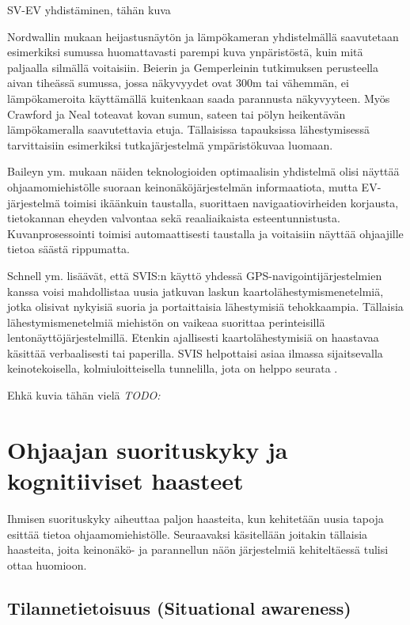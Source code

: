 \documentclass[utf8,bachelor,manualbib]{gradu3}
\begin{document}
SV-EV yhdistäminen, tähän kuva \citep{mollersachs1994}

Nordwallin \citeyearpar{nordwall1993} mukaan heijastusnäytön ja lämpökameran yhdistelmällä saavutetaan esimerkiksi sumussa huomattavasti parempi kuva ynpäristöstä, kuin mitä paljaalla silmällä voitaisiin. Beierin ja Gemperleinin \citeyearpar{beiergemperlein2004} tutkimuksen perusteella aivan tiheässä sumussa, jossa näkyvyydet ovat 300m tai vähemmän, ei lämpökameroita käyttämällä kuitenkaan saada parannusta näkyvyyteen. Myös Crawford ja Neal \citeyearpar{crawfordneal2006} toteavat kovan sumun, sateen tai pölyn heikentävän lämpökameralla saavutettavia etuja. Tällaisissa tapauksissa lähestymisessä tarvittaisiin esimerkiksi tutkajärjestelmä ympäristökuvaa luomaan.

Baileyn ym.\citeyearpar{baileyym2007} mukaan näiden teknologioiden optimaalisin yhdistelmä olisi näyttää ohjaamomiehistölle suoraan keinonäköjärjestelmän informaatiota, mutta EV-järjestelmä toimisi ikäänkuin taustalla, suorittaen navigaatiovirheiden korjausta, tietokannan eheyden valvontaa sekä reaaliaikaista esteentunnistusta. Kuvanprosessointi toimisi automaattisesti taustalla ja voitaisiin näyttää ohjaajille tietoa säästä rippumatta.

Schnell ym. \citeyearpar{schnellym2004} lisäävät, että SVIS:n käyttö yhdessä GPS-navigointijärjestelmien kanssa voisi mahdollistaa uusia jatkuvan laskun kaartolähestymismenetelmiä, jotka olisivat nykyisiä suoria ja portaittaisia lähestymisiä tehokkaampia. Tällaisia lähestymismenetelmiä miehistön on vaikeaa suorittaa perinteisillä lentonäyttöjärjestelmillä. Etenkin ajallisesti kaartolähestymisiä on haastavaa käsittää verbaalisesti tai paperilla. SVIS helpottaisi asiaa ilmassa sijaitsevalla keinotekoisella, kolmiuloitteisella tunnelilla, jota on helppo seurata \citep{barrowspowell1999}.

Ehkä kuvia tähän vielä \citep{schnellym2004} \emph{TODO:}

\chapter{Ohjaajan suorituskyky ja kognitiiviset haasteet}

Ihmisen suorituskyky aiheuttaa paljon haasteita, kun kehitetään uusia tapoja 
esittää tietoa ohjaamomiehistölle. Seuraavaksi käsitellään joitakin tällaisia haasteita, joita keinonäkö- ja parannellun näön järjestelmiä kehiteltäessä tulisi ottaa huomioon.

\section{Tilannetietoisuus (Situational awareness)}
\end{document}
